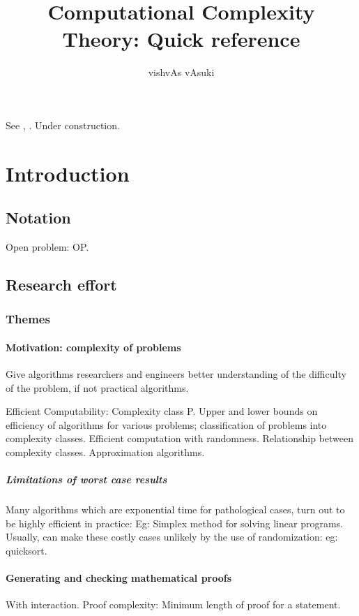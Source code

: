 \documentclass[oneside, article]{memoir}
\title{Computational Complexity Theory: Quick reference}
\author{vishvAs vAsuki}
\begin{document}
\maketitle

See \cite{papadimitriouCC}, \cite{aroraBarakCC}. Under construction.

\part{Introduction}
\chapter{Notation}
Open problem: OP.

\chapter{Research effort}
\section{Themes}
\subsection{Motivation: complexity of problems}
Give algorithms researchers and engineers better understanding of the difficulty of the problem, if not practical algorithms.

Efficient Computability: Complexity class P. Upper and lower bounds on efficiency of algorithms for various problems; classification of problems into complexity classes. Efficient computation with randomness. Relationship between complexity classes. Approximation algorithms.

\subsubsection{Limitations of worst case results}
Many algorithms which are exponential time for pathological cases, turn out to be highly efficient in practice: Eg: Simplex method for solving linear programs. Usually, can make these costly cases unlikely by the use of randomization: eg: quicksort.

\subsection{Generating and checking mathematical proofs}
With interaction. Proof complexity: Minimum length of proof for a statement.
\end{document}

